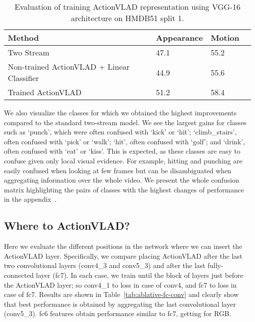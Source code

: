 \documentclass[10pt,twocolumn,letterpaper]{article}
\newcommand{\methodTag}[0]{ActionVLAD}
\newcommand{\tableSize}[0]{\scriptsize}
\begin{document}
\begin{table}[]
\caption{Evaluation of training \methodTag{} representation
using VGG-16 architecture on HMDB51 split 1.}
\label{tab:train_thru_netvlad}
\tableSize{}
\centering
\begin{tabular}{llll}
\toprule
Method    & Appearance  & Motion      &  \\
\midrule
Two Stream~\cite{Feichtenhofer_16} & 47.1 & 55.2 \\
Non-trained \methodTag{} + Linear Classifier & 44.9 & 55.6 \\
Trained \methodTag{} & 51.2 & 58.4 \\
\bottomrule
\end{tabular}
\end{table}


We also visualize the classes for which we obtained the highest improvements compared to the standard two-stream model.
We see the largest gains for classes such as `punch', which
were often confused with `kick' or `hit';
`climb\_stairs', often confused with `pick' or `walk';
`hit', often confused with `golf'; and `drink', 
often confused with `eat' or `kiss'. This is expected,
as these classes are easy to confuse given only local visual evidence.
For example, hitting and punching are easily confused when looking at few frames but can be disambiguated when aggregating information over the whole video. We present the whole confusion matrix highlighting the pairs of classes with the highest changes of performance in the appendix~\cite{appendix}.




\subsection{Where to \methodTag{}?}\label{sec:expts:whereNetVLAD}

Here we evaluate the different positions in the network where we
can insert the \methodTag{} layer. Specifically, we compare placing \methodTag{}  after the last two 
convolutional layers (conv4\_3 and conv5\_3) and after the last fully-connected layer (fc7). In each case, we train until the block of layers just before
the \methodTag{} layer; so conv4\_1 to loss in case of conv4, and 
fc7 to loss in case of fc7.
Results are shown in Table~\ref{tab:ablative-fc-conv} and clearly show that best performance is obtained by aggregating the last convolutional layer (conv5\_3). fc6 features obtain performance similar to fc7,
getting  for RGB.
\end{document}
